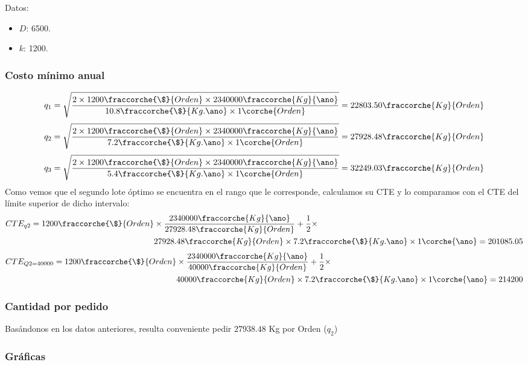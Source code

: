 \begin{homeworkProblem}
Datos:
\begin{itemize}
    \item $D$: 6500.
    \item $k$: 1200.
\end{itemize}
\subsubsection{Costo mínimo anual}
\begin{align*}
    q_1=\sqrt{
        \frac{
            2\times 1200\fraccorche{\$}{Orden}\times 2340000\fraccorche{Kg}{\ano}
            }{
                10.8\fraccorche{\$}{Kg.\ano}\times 1\corche{Orden}
            }
        }
        =
        22803.50\fraccorche{Kg}{Orden}
\end{align*}
\begin{align*}
    q_2=\sqrt{
        \frac{
            2\times 1200\fraccorche{\$}{Orden}\times 2340000\fraccorche{Kg}{\ano}
            }{
                7.2\fraccorche{\$}{Kg.\ano}\times 1\corche{Orden}
            }
        }
        =
        27928.48\fraccorche{Kg}{Orden}
\end{align*}
\begin{align*}
    q_3=\sqrt{
        \frac{
            2\times 1200\fraccorche{\$}{Orden}\times 2340000\fraccorche{Kg}{\ano}
            }{
                5.4\fraccorche{\$}{Kg.\ano}\times 1\corche{Orden}
            }
        }
        =
        32249.03\fraccorche{Kg}{Orden}
\end{align*}
Como vemos que el segundo lote óptimo se encuentra en el rango que le corresponde, calculamos su CTE y lo comparamos con el CTE del límite superior de dicho intervalo:
\begin{align*}
    CTE_{q2} = 1200\fraccorche{\$}{Orden}&\times \frac{2340000\fraccorche{Kg}{\ano}}{27928.48\fraccorche{Kg}{Orden}}  + \frac{1}{2}\times \\ & 27928.48\fraccorche{Kg}{Orden}\times 7.2\fraccorche{\$}{Kg.\ano}\times 1\corche{\ano}=201085.05
\end{align*}
\begin{align*}
    CTE_{Q2=40000} = 1200\fraccorche{\$}{Orden}&\times \frac{2340000\fraccorche{Kg}{\ano}}{40000\fraccorche{Kg}{Orden}}  + \frac{1}{2}\times \\ & 40000\fraccorche{Kg}{Orden}\times 7.2\fraccorche{\$}{Kg.\ano}\times 1\corche{\ano}=214200
\end{align*}

\subsubsection{Cantidad por pedido}
Basándonos en los datos anteriores, resulta conveniente pedir $27938.48$ Kg por Orden ($q_2$)

\subsubsection{Gráficas}
\end{homeworkProblem}